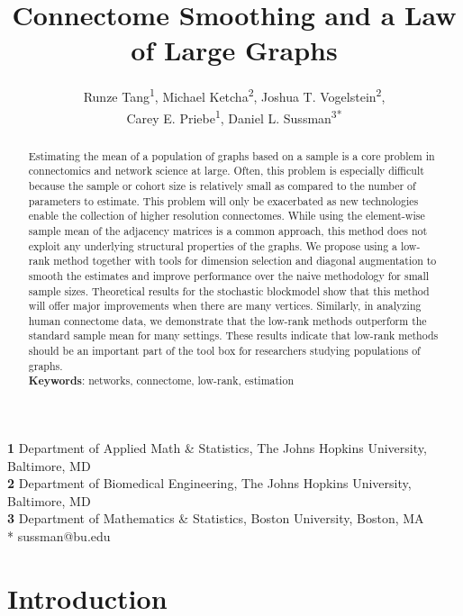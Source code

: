 \documentclass[10pt,letterpaper]{article}
\date{}
\title{Connectome Smoothing and a Law of Large Graphs}
\author{
Runze Tang\textsuperscript{1},
Michael Ketcha\textsuperscript{2},
Joshua T. Vogelstein\textsuperscript{2},\\
Carey E. Priebe\textsuperscript{1},
Daniel L. Sussman\textsuperscript{3*}}
\begin{document}
\maketitle



{\footnotesize
\noindent \textbf{1} Department of Applied Math \& Statistics, The Johns Hopkins University, Baltimore, MD
\\
\textbf{2} Department of Biomedical Engineering,  The Johns Hopkins University, Baltimore, MD
\\
\textbf{3} Department of Mathematics \& Statistics, Boston University, Boston, MA
\\
* sussman@bu.edu
}



\linenumbers
\begin{abstract}
Estimating the mean of a population of graphs based on a sample is a core problem in connectomics and network science at large.
Often, this problem is especially difficult because the sample or cohort size is relatively small as compared to the number of parameters to estimate.
This problem will only be exacerbated as new technologies enable the collection of higher resolution connectomes.
While using the element-wise sample mean of the adjacency matrices is a common approach, this method does not exploit any underlying structural properties of the graphs.
We propose using a low-rank method together with tools for dimension selection and diagonal augmentation to smooth the estimates and improve performance over the naive methodology for small sample sizes.
Theoretical results for the stochastic blockmodel show that this method will offer major improvements when there are many vertices.
Similarly, in analyzing human connectome data, we demonstrate that the low-rank methods outperform the standard sample mean for many settings.
These results indicate that low-rank methods should be an important part of the tool box for researchers studying populations of graphs.\\
{\bf Keywords}: networks, connectome, low-rank, estimation
\end{abstract}





\section{Introduction}
\end{document}
